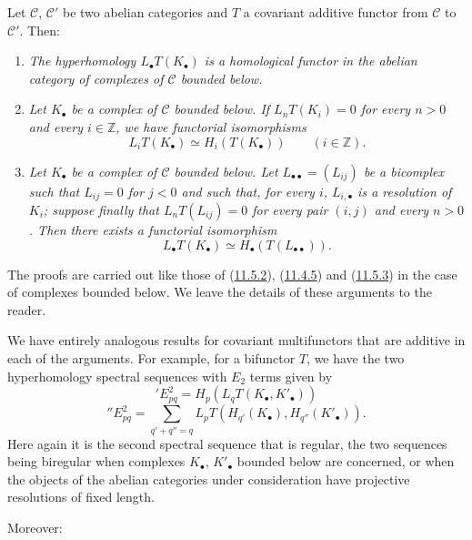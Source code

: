 \begin{proposition}[11.6.3]
\label{0.11.6.3}
Let $\mathcal C$, $\mathcal C'$ be two abelian categories and $T$ a covariant
additive functor from $\mathcal C$ to $\mathcal C'$. Then:
\begin{enumerate}
\item[{\rm(i)}] \emph{The hyperhomology $L_\bullet T(K_\bullet)$ is a
homological functor in the abelian category of complexes of
$\mathcal C$ bounded below.}
\item[{\rm(ii)}] \emph{Let $K_\bullet$ be a complex of $\mathcal C$ bounded
below. If $L_nT(K_i)=0$ for every $n>0$ and every $i\in\mathbb Z$, we
have functorial isomorphisms}
\[
\label{0.11.6.3.1}
\tag{11.6.3.1}
L_iT(K_\bullet)\simeq H_i(T(K_\bullet))\qquad(i\in\mathbb Z).
\]
\item[{\rm(iii)}] \emph{Let $K_\bullet$ be a complex of $\mathcal C$ bounded
below. Let $L_{\bullet\bullet}=(L_{ij})$ be a bicomplex such that
$L_{ij}=0$ for $j<0$ and such that, for every $i$, $L_{i,\bullet}$ is a
resolution of $K_i$; suppose finally that $L_nT(L_{ij})=0$ for every pair
$(i,j)$ and every $n>0$. Then there exists a functorial isomorphism}
\[
\label{0.11.6.3.2}
\tag{11.6.3.2}
L_\bullet T(K_\bullet)\simeq H_\bullet(T(L_{\bullet\bullet})).
\]
\end{enumerate}
The proofs are carried out like those of
(\hyperref[0.11.5.2]{11.5.2}), (\hyperref[0.11.4.5]{11.4.5}) and
(\hyperref[0.11.5.3]{11.5.3}) in the case of complexes bounded
below. We leave the details of these arguments to the reader.
\end{proposition}

\begin{env}[11.6.4]
\label{0.11.6.4}
We have entirely analogous results for covariant multifunctors that are
additive in each of the arguments. For example, for a bifunctor $T$, we have
the two hyperhomology spectral sequences with $E_2$ terms given by
\[
\label{0.11.6.4.1}
\tag{11.6.4.1}
{}'E^2_{pq}=H_p(L_qT(K_\bullet,K'_\bullet))
\]
\[
\label{0.11.6.4.2}
\tag{11.6.4.2}
{}''E^2_{pq}=
\sum_{q'+q''=q}L_pT(H_{q'}(K_\bullet),H_{q''}(K'_\bullet)).
\]
Here again it is the second spectral sequence that is regular, the two
sequences being biregular when complexes $K_\bullet$,
$K'_\bullet$ bounded below are concerned, or when the objects of the abelian
categories under consideration have projective resolutions of fixed
length.

Moreover:
\end{env}

